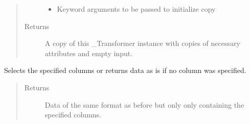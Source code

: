 \documentclass[letterpaper,10pt,english]{sphinxmanual}
\begin{document}
\begin{fulllineitems}
\begin{fulllineitems}
\begin{quote}
\begin{description}
\begin{itemize}
\item {} 
 \textendash{} Keyword arguments to be passed to initialize copy

\end{itemize}

\item[{Returns}] \leavevmode
A copy of this \_Transformer instance with copies of necessary
attributes and empty input.

\end{description}\end{quote}

\end{fulllineitems}


\begin{fulllineitems}
\label{\detokenize{dalio.pipe:dalio.pipe.selection.ColSelect.transform}}
Selects the specified columns or returns data as is if no column
was specified.
\begin{quote}\begin{description}
\item[{Returns}] \leavevmode
Data of the same format as before but only only containing the
specified columns.

\end{description}\end{quote}

\end{fulllineitems}


\end{fulllineitems}

\end{document}
